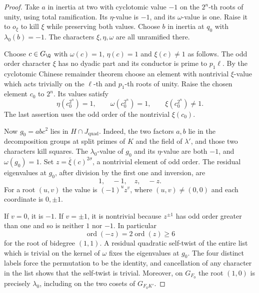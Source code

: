 \begin{proof}

Take \(a\) in inertia at two with cyclotomic value \(-1\)
on the \(2^n\)-th roots of unity, using total ramification.
Its \(\eta\)-value is \(-1\), and its \(\omega\)-value is
one. Raise it to \(o_\xi\) to kill \(\xi\) while preserving both
values. Choose \(b\) in inertia at \(q_0\) with
\(\lambda_0(b)=-1\). The characters \(\xi,\eta,\omega\)
are all unramified there.

Choose \(c\in G_{\Q}\) with
\(\omega(c)=1\), \(\eta(c)=1\) and \(\xi(c)\ne1\)
as follows. The odd order character \(\xi\) has no
dyadic part and its conductor is prime to \(p_1\ell\).
By the cyclotomic Chinese remainder theorem choose an
element with nontrivial \(\xi\)-value which acts
trivially on the \(\ell\)-th and \(p_1\)-th roots of unity.
Raise the chosen element \(c_0\) to \(2^n\). Its values
satisfy
\[
 \eta(c_0^{2^n})=1,\qquad \omega(c_0^{2^n})=1,\qquad
                        \xi(c_0^{2^n})\ne1 .
\]
The last assertion uses the odd order of the nontrivial
\(\xi(c_0)\).

Now \(g_0=abc^2\) lies in \(H\cap J_{\mathrm{quad}}\).
Indeed, the two factors \(a,b\) lie in the decomposition
groups at split primes of \(K\) and the field of
\(\lambda'\), and those two characters kill squares.
The \(\lambda_0\)-value of \(g_0\) and its \(\eta\)-value
are both \(-1\), and \(\omega(g_0)=1\).
Set \(z=\bar\xi(c)^{2\sigma}\), a nontrivial element of
odd order. The residual eigenvalues at \(g_0\), after
division by the first one and inversion, are
\[
                              1,\quad -1,\quad z,\quad -z.
\]
For a root \((u,v)\) the value is \((-1)^u z^v\),
where \((u,v)\ne(0,0)\) and each coordinate is \(0,\pm1\).

If \(v=0\), it is \(-1\). If \(v=\pm1\), it is nontrivial
because \(z^{\pm1}\) has odd order greater than one and so
is neither \(1\) nor \(-1\). In particular
\[
            \operatorname{ord}(-z)
                   =2\operatorname{ord}(z)\ge6
\]
for the root of bidegree \((1,1)\). A residual quadratic
self-twist of the entire list which is trivial on the
kernel of \(\omega\) fixes the eigenvalues at \(g_0\).
The four distinct labels force the permutation to be
the identity, and cancellation of any character in the
list shows that the self-twist is trivial. Moreover,
on \(G_{F_0}\) the root \((1,0)\) is precisely
\(\lambda_0\), including on the two cosets of
\(G_{F_0K'}\).


\end{proof}
